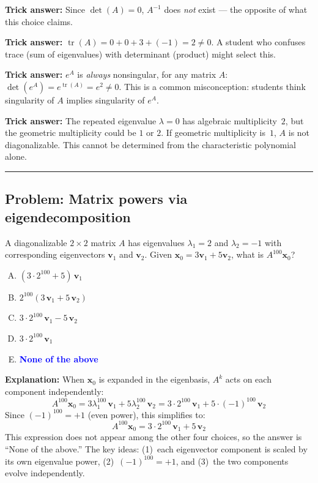 \documentclass[12pt]{amsart}
\newcommand{\divider}{
  \vspace{-1em}
  \noindent
  \raisebox{-0.15ex}{\textbullet}%
  \hspace{0.5em}%
  \rule[0.5ex]{0.95\textwidth}{1.0pt}%
  \hspace{0.5em}%
  \raisebox{-0.15ex}{\textbullet}%
  \vspace{0em}
}
\begin{document}
\textbf{Trick answer:}
Since $\det(A) = 0$, $A^{-1}$ does \emph{not} exist --- the opposite of
what this choice claims.

\textbf{Trick answer:}
$\operatorname{tr}(A) = 0 + 0 + 3 + (-1) = 2 \neq 0$. A student who
confuses trace (sum of eigenvalues) with determinant (product) might
select this.

\textbf{Trick answer:}
$e^A$ is \emph{always} nonsingular, for any matrix $A$:
$\det(e^A) = e^{\operatorname{tr}(A)} = e^2 \neq 0$. This is a common
misconception: students think singularity of $A$ implies singularity
of $e^A$.

\textbf{Trick answer:}
The repeated eigenvalue $\lambda = 0$ has algebraic multiplicity~$2$,
but the geometric multiplicity could be $1$ or $2$. If geometric
multiplicity is~$1$, $A$ is not diagonalizable. This cannot be determined
from the characteristic polynomial alone.

\divider

\subsection*{Problem: Matrix powers via eigendecomposition}

A diagonalizable $2 \times 2$ matrix $A$ has eigenvalues $\lambda_1 = 2$
and $\lambda_2 = -1$ with corresponding eigenvectors $\mathbf{v}_1$
and $\mathbf{v}_2$.
Given $\mathbf{x}_0 = 3\mathbf{v}_1 + 5\mathbf{v}_2$,
what is $A^{100}\mathbf{x}_0$?

\begin{enumerate}[(A)]
\item $(3 \cdot 2^{100} + 5)\,\mathbf{v}_1$
\item $2^{100}(3\,\mathbf{v}_1 + 5\,\mathbf{v}_2)$
\item $3 \cdot 2^{100}\,\mathbf{v}_1 - 5\,\mathbf{v}_2$
\item $3 \cdot 2^{100}\,\mathbf{v}_1$
\item \textcolor{blue}{\textbf{None of the above}}
\end{enumerate}

\textbf{Explanation:}
When $\mathbf{x}_0$ is expanded in the eigenbasis, $A^k$ acts on each
component independently:
$$A^{100}\mathbf{x}_0 = 3\lambda_1^{100}\,\mathbf{v}_1
  + 5\lambda_2^{100}\,\mathbf{v}_2
  = 3 \cdot 2^{100}\,\mathbf{v}_1 + 5 \cdot (-1)^{100}\,\mathbf{v}_2$$
Since $(-1)^{100} = +1$ (even power), this simplifies to:
$$A^{100}\mathbf{x}_0 = 3 \cdot 2^{100}\,\mathbf{v}_1
  + 5\,\mathbf{v}_2$$
This expression does not appear among the other four choices, so the
answer is ``None of the above.'' The key ideas: (1)~each eigenvector
component is scaled by its own eigenvalue power, (2)~$(-1)^{100} = +1$,
and (3)~the two components evolve independently.
\end{document}
